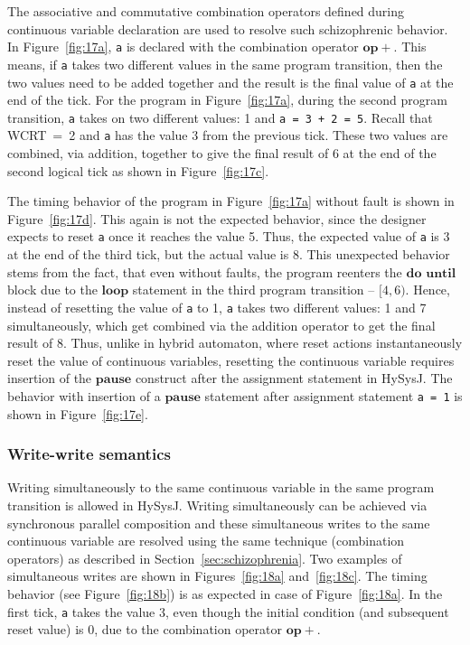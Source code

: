 \documentclass[10pt,journal,cspaper,compsoc]{IEEEtran}
\begin{document}
The associative and commutative combination operators defined during
continuous variable declaration are used to resolve such schizophrenic
behavior. In Figure~\ref{fig:17a}, \texttt{a} is declared with the
combination operator $\mathbf{op+}$. This means, if \texttt{a} takes two
different values in the same program transition, then the two values
need to be added together and the result is the final value of
\texttt{a} at the end of the tick. For the program in
Figure~\ref{fig:17a}, during the second program transition, \texttt{a}
takes on two different values: 1 and \texttt{a = 3 + 2 = 5}. Recall that
\mbox{WCRT = 2} and \texttt{a} has the value 3 from the previous
tick. These two values are combined, via addition, together to give the
final result of 6 at the end of the second logical tick as shown in
Figure~\ref{fig:17c}.

The timing behavior of the program in Figure~\ref{fig:17a} without fault
is shown in Figure~\ref{fig:17d}. This again is not the expected
behavior, since the designer expects to reset \texttt{a} once it reaches
the value 5. Thus, the expected value of \texttt{a} is 3 at the end of
the third tick, but the actual value is 8. This unexpected behavior
stems from the fact, that even without faults, the program reenters the
$\mathbf{do}$ $\mathbf{until}$ block due to the $\mathbf{loop}$
statement in the third program transition -- $[4,6)$. Hence, instead of
resetting the value of \texttt{a} to 1, \texttt{a} takes two different
values: 1 and 7 simultaneously, which get combined via the addition
operator to get the final result of 8. Thus, unlike in hybrid automaton,
where reset actions instantaneously reset the value of continuous
variables, resetting the continuous variable requires insertion of the
$\mathbf{pause}$ construct after the assignment statement in HySysJ. The
behavior with insertion of a $\mathbf{pause}$ statement after assignment
statement \texttt{a = 1} is shown in Figure~\ref{fig:17e}.

\subsubsection{Write-write semantics}
\label{sec:write-write-semant-2}

Writing simultaneously to the same continuous variable in the same
program transition is allowed in HySysJ. Writing simultaneously can be
achieved via synchronous parallel composition and these simultaneous
writes to the same continuous variable are resolved using the same
technique (combination operators) as described in
Section~\ref{sec:schizophrenia}. Two examples of simultaneous writes are
shown in Figures~\ref{fig:18a} and~\ref{fig:18c}. The timing behavior
(see Figure~\ref{fig:18b}) is as expected in case of
Figure~\ref{fig:18a}. In the first tick, \texttt{a} takes the value 3,
even though the initial condition (and subsequent reset value) is 0, due
to the combination operator $\mathbf{op+}$. 
\end{document}
